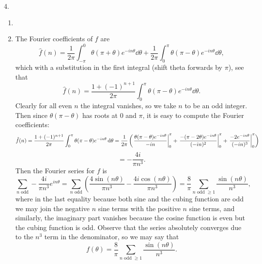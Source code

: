 \documentclass[11pt]{article}
\newcommand{\br}[1]{\left(#1\right)}
\begin{document}
4. \begin{enumerate}[label=(\alph*)]
    \item 
    
    \item \vspace*{5cm} The Fourier coefficients of $f$ are \[\hat{f}(n) = \frac{1}{2\pi}\int_{-\pi}^{0}\theta(\pi+\theta)e^{-in\theta}\dd{\theta} + \frac{1}{2\pi}\int_{0}^{\pi}\theta(\pi-\theta)e^{-in\theta}\dd{\theta},\] which with a substitution in the first integral (shift theta forwards by $\pi$), see that \[\hat{f}(n) = \frac{1+(-1)^{n+1}}{2\pi}\int_{0}^{\pi}\theta(\pi-\theta)e^{-in\theta}\dd{\theta}.\] Clearly for all even $n$ the integral vanishes, so we take $n$ to be an odd integer. Then since $\theta(\pi-\theta)$ has roots at $0$ and $\pi$, it is easy to compute the Fourier coefficients: \[\hat{f}(n) = \frac{1+(-1)^{n+1}}{2\pi}\int_{0}^{\pi}\theta(\pi-\theta)e^{-in\theta}\dd{\theta} = \frac{1}{2\pi}\br{\eval{\frac{\theta(\pi-\theta)e^{-in\theta}}{-in}}_{0}^{\pi} +\eval{\frac{-(\pi-2\theta)e^{-in\theta}}{(-in)^2}}_{0}^{\pi} + \eval{\frac{-2e^{-in\theta}}{(-in)^3}}_{0}^{\pi}}\]\[= -\frac{4i}{\pi n^3}.\] Then the Fourier series for $f$ is \[\sum_{n \text{ odd}} -\frac{4i}{\pi n^3}e^{in\theta} = \sum_{n \text{ odd}} \br{\frac{4\sin(n\theta)}{\pi n^3} - \frac{4i\cos(n\theta)}{\pi n^3}} = \frac{8}{\pi}\sum_{n \text{ odd } \geq 1} \frac{\sin(n\theta)}{n^3},\] where in the last equality because both sine and the cubing function are odd we may join the negative $n$ sine terms with the positive $n$ sine terms, and similarly, the imaginary part vanishes because the cosine function is even but the cubing function is odd. Observe that the series absolutely converges due to the $n^3$ term in the denominator, so we may say that \[f(\theta) = \frac{8}{\pi}\sum_{n \text{ odd } \geq 1} \frac{\sin(n\theta)}{n^3}.\]
\end{enumerate}
\end{document}
